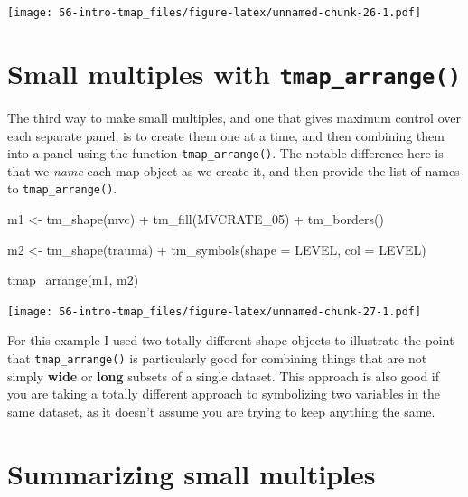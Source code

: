 \documentclass[
]{book}
\newenvironment{Shaded}{\begin{snugshade}}{\end{snugshade}}
\newcommand{\AttributeTok}[1]{\textcolor[rgb]{0.77,0.63,0.00}{#1}}
\newcommand{\FunctionTok}[1]{\textcolor[rgb]{0.00,0.00,0.00}{#1}}
\newcommand{\NormalTok}[1]{#1}
\newcommand{\OtherTok}[1]{\textcolor[rgb]{0.56,0.35,0.01}{#1}}
\newcommand{\SpecialCharTok}[1]{\textcolor[rgb]{0.00,0.00,0.00}{#1}}
\newcommand{\StringTok}[1]{\textcolor[rgb]{0.31,0.60,0.02}{#1}}
\begin{document}
\texttt{[image: 56-intro-tmap\_files/figure-latex/unnamed-chunk-26-1.pdf]}

\hypertarget{small-multiples-with-tmap_arrange}{%
\section{\texorpdfstring{Small multiples with \texttt{tmap\_arrange()}}{Small multiples with tmap\_arrange()}}\label{small-multiples-with-tmap_arrange}}

The third way to make small multiples, and one that gives maximum control over each separate panel, is to create them one at a time, and then combining them into a panel using the function \texttt{tmap\_arrange()}. The notable difference here is that we \emph{name} each map object as we create it, and then provide the list of names to \texttt{tmap\_arrange()}.

\begin{Shaded}
\begin{Highlighting}[]
\NormalTok{m1 }\OtherTok{\textless{}{-}} \FunctionTok{tm\_shape}\NormalTok{(mvc) }\SpecialCharTok{+}
  \FunctionTok{tm\_fill}\NormalTok{(}\StringTok{\textquotesingle{}MVCRATE\_05\textquotesingle{}}\NormalTok{) }\SpecialCharTok{+}
  \FunctionTok{tm\_borders}\NormalTok{()}

\NormalTok{m2 }\OtherTok{\textless{}{-}} \FunctionTok{tm\_shape}\NormalTok{(trauma) }\SpecialCharTok{+}
  \FunctionTok{tm\_symbols}\NormalTok{(}\AttributeTok{shape =} \StringTok{\textquotesingle{}LEVEL\textquotesingle{}}\NormalTok{,}
             \AttributeTok{col =} \StringTok{\textquotesingle{}LEVEL\textquotesingle{}}\NormalTok{)}

\FunctionTok{tmap\_arrange}\NormalTok{(m1, m2)}
\end{Highlighting}
\end{Shaded}

\texttt{[image: 56-intro-tmap\_files/figure-latex/unnamed-chunk-27-1.pdf]}

For this example I used two totally different shape objects to illustrate the point that \texttt{tmap\_arrange()} is particularly good for combining things that are not simply \textbf{wide} or \textbf{long} subsets of a single dataset. This approach is also good if you are taking a totally different approach to symbolizing two variables in the same dataset, as it doesn't assume you are trying to keep anything the same.

\hypertarget{summarizing-small-multiples}{%
\section{Summarizing small multiples}\label{summarizing-small-multiples}}
\end{document}

